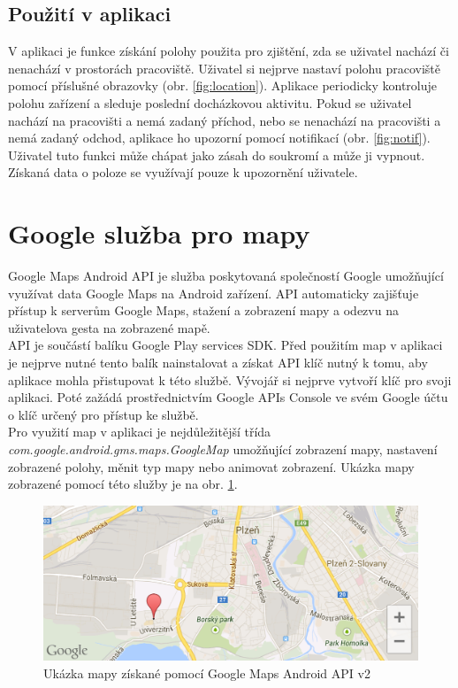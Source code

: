 \documentclass{diplomka}
\begin{document}
\subsection*{Použití v aplikaci}
V aplikaci je funkce získání polohy použita pro zjištění, zda se uživatel nachází či nenachází v prostorách pracoviště. Uživatel si nejprve nastaví polohu pracoviště pomocí příslušné obrazovky (obr. \ref{fig:location}). Aplikace periodicky kontroluje polohu zařízení a sleduje poslední docházkovou aktivitu. Pokud se uživatel nachází na pracovišti a nemá zadaný příchod, nebo se nenachází na pracovišti a nemá zadaný odchod, aplikace ho upozorní pomocí notifikací (obr. \ref{fig:notif}). Uživatel tuto funkci může chápat jako zásah do soukromí a může ji vypnout. Získaná data o poloze se využívají pouze k upozornění uživatele.

\section{Google služba pro mapy}
Google Maps Android API\cite{map} je služba poskytovaná společností Google umožňující využívat data Google Maps na Android zařízení. API automaticky zajišťuje přístup k serverům Google Maps, stažení a zobrazení mapy a odezvu na uživatelova gesta na zobrazené mapě. \\ \indent
API je součástí balíku Google Play services SDK\cite{play}. Před použitím map v aplikaci je nejprve nutné tento balík nainstalovat a získat API klíč nutný k tomu, aby aplikace mohla přistupovat k této službě. Vývojář si nejprve vytvoří klíč pro svoji aplikaci. Poté zažádá prostřednictvím Google APIs Console ve svém Google účtu o klíč určený pro přístup ke službě. \\ \indent
Pro využití map v aplikaci je nejdůležitější třída\\ \emph{com.google.android.gms.maps.GoogleMap} umožňující zobrazení mapy, nastavení zobrazené polohy, měnit typ mapy nebo animovat zobrazení. Ukázka mapy zobrazené pomocí této služby je na obr. \ref{fig:map}.

\begin{figure}[H]
  \centering
  \includegraphics[scale=0.43]{scr/map.png}
\caption{Ukázka mapy získané pomocí Google Maps Android API v2}
\label{fig:map}
\end{figure}
\end{document}
